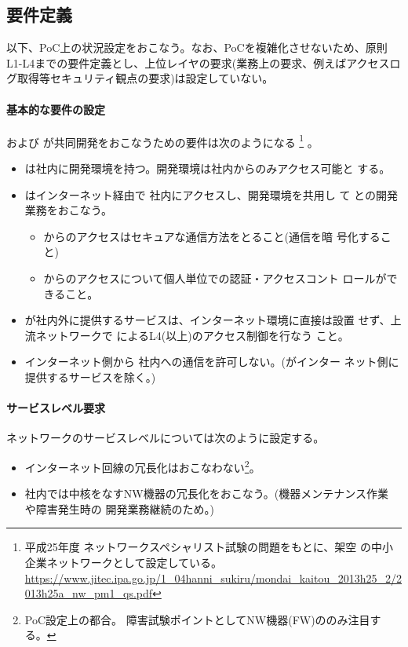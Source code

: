   \subsection{要件定義}

以下、PoC上の状況設定をおこなう。なお、PoCを複雑化させないため、原則
L1-L4までの要件定義とし、上位レイヤの要求(業務上の要求、例えばアクセスロ
グ取得等セキュリティ観点の要求)は設定していない。

    \paragraph{基本的な要件の設定}
\yo および \tj が共同開発をおこなうための要件は次のようになる
\footnote{平成25年度 ネットワークスペシャリスト試験の問題をもとに、架空
の中小企業ネットワークとして設定している。
\url{https://www.jitec.ipa.go.jp/1_04hanni_sukiru/mondai_kaitou_2013h25_2/2013h25a_nw_pm1_qs.pdf}}
。
\begin{itemize}
 \item \yo は社内に開発環境を持つ。開発環境は社内からのみアクセス可能と
       する。
 \item \tj はインターネット経由で \yo 社内にアクセスし、開発環境を共用し
       て \yo との開発業務をおこなう。
       \begin{itemize}
        \item \tj からのアクセスはセキュアな通信方法をとること(通信を暗
              号化すること)
        \item \tj からのアクセスについて個人単位での認証・アクセスコント
              ロールができること。
       \end{itemize}
 \item \yo が社内外に提供するサービスは、インターネット環境に直接は設置
       せず、上流ネットワークで \yo によるL4(以上)のアクセス制御を行なう
       こと。
 \item インターネット側から \yo 社内への通信を許可しない。(\yo がインター
       ネット側に提供するサービスを除く。)
\end{itemize}

    \paragraph{サービスレベル要求}

ネットワークのサービスレベルについては次のように設定する。
\begin{itemize}
 \item インターネット回線の冗長化はおこなわない\footnote{PoC設定上の都合。
       障害試験ポイントとしてNW機器(FW)ののみ注目する。}。
 \item 社内では中核をなすNW機器の冗長化をおこなう。(機器メンテナンス作業
       や障害発生時の \tj 開発業務継続のため。)
\end{itemize}

